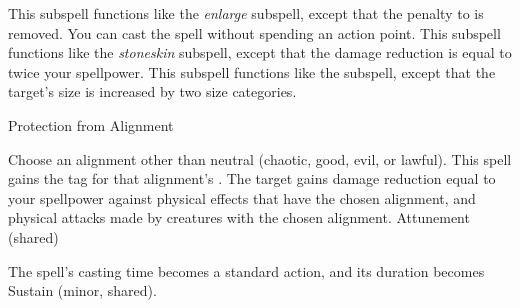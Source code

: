 This subspell functions like the \textit{enlarge} subspell, except that the penalty to  is removed.
You can cast the spell without spending an action point.
This subspell functions like the \textit{stoneskin} subspell, except that the damage reduction is equal to twice your spellpower.
This subspell functions like the  subspell, except that the target's size is increased by two size categories.
\begin{spellsection}{Protection from Alignment}
\begin{spellcontent}
\begin{spelltargetinginfo}
\end{spelltargetinginfo}
\begin{spelleffects}
\spellspecial
Choose an alignment other than neutral (chaotic, good, evil, or lawful).
This spell gains the tag for that alignment's .
\spelleffect
The target gains damage reduction equal to your spellpower against physical effects that have the chosen alignment, and physical attacks made by creatures with the chosen alignment.
\spelldur Attunement (shared)
\end{spelleffects}
\end{spellcontent}
\begin{spellfooter}
\end{spellfooter}
\begin{spellsubcontent}
\begin{spellcantrip}
The spell's casting time becomes a standard action, and its duration becomes Sustain (minor, shared).
\end{spellcantrip}
\end{spellsubcontent}
\end{spellsection}
